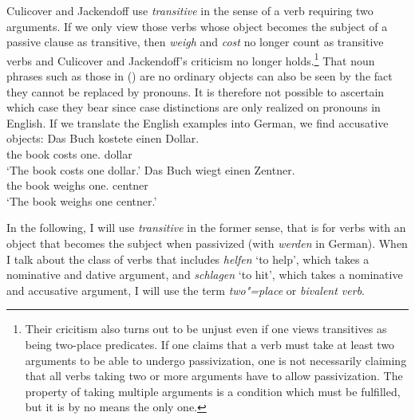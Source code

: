 Culicover and Jackendoff use \emph{transitive} in the sense of a verb requiring two arguments. If we only view those verbs whose object becomes the subject of
a passive clause as transitive, then \emph{weigh} and \emph{cost} no longer count as transitive verbs and Culicover and Jackendoff's criticism no longer holds.\footnote{
Their cricitism also turns out to be unjust even if one views transitives as being two-place predicates. If one claims that a verb must take at least two arguments to be able
to undergo passivization, one is not necessarily claiming that all verbs taking two or more arguments have to allow passivization. The property of taking multiple arguments is
a condition which must be fulfilled, but it is by no means the only one.
}
That noun phrases such as those in () are no ordinary objects can also be seen by the fact they cannot be replaced by pronouns. It is therefore not possible to ascertain
which case they bear since case distinctions are only realized on pronouns in English.
If we translate the English examples into German, we find accusative objects:
\eal
\ex 
\gll Das Buch kostete einen Dollar.\\
      the book costs one.\acc{} dollar\\
\glt `The book costs one dollar.'
\ex 
\gll Das Buch wiegt einen Zentner.\\
     the book weighs one.\acc{} centner\\
\glt `The book weighs one centner.'
\zl



In the following, I will use \emph{transitive} in the former sense, that is for verbs with an object that becomes the subject when passivized (\eg with
\emph{werden} in German). When I talk about the class of verbs that includes \emph{helfen} `to help', which takes a nominative and dative argument, and \emph{schlagen} `to hit', 
which takes a nominative and accusative argument, I will use the term \emph{two"=place} or \emph{bivalent verb}.

